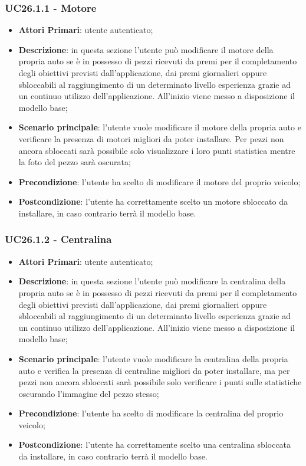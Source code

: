 \subsubsection{UC26.1.1 - Motore}
\begin{itemize}
	\item \textbf{Attori Primari}: utente autenticato;
	\item \textbf{Descrizione}: in questa sezione l'utente può modificare il motore della propria auto se è in possesso di pezzi ricevuti da premi per il completamento degli obiettivi previsti dall'applicazione, dai premi giornalieri oppure sbloccabili al raggiungimento di un determinato livello esperienza grazie ad un continuo utilizzo dell'applicazione.
	All'inizio viene messo a disposizione il modello base;
	\item \textbf{Scenario principale}: l'utente vuole modificare il motore della propria auto e verificare la presenza di motori migliori da poter installare. Per pezzi non ancora sbloccati sarà possibile solo visualizzare i loro punti statistica mentre la foto del pezzo sarà oscurata;
	\item \textbf{Precondizione}: l'utente ha scelto di modificare il motore del proprio veicolo; 
	\item \textbf{Postcondizione}: l'utente ha correttamente scelto un motore sbloccato da installare, in caso contrario terrà il modello base.
\end{itemize}
\subsubsection{UC26.1.2 - Centralina}
\begin{itemize}
	\item \textbf{Attori Primari}: utente autenticato;
	\item \textbf{Descrizione}: in questa sezione l'utente può modificare la centralina della propria auto se è in possesso di pezzi ricevuti da premi per il completamento degli obiettivi previsti dall'applicazione, dai premi giornalieri oppure sbloccabili al raggiungimento di un determinato livello esperienza grazie ad un continuo utilizzo dell'applicazione.
	All'inizio viene messo a disposizione il modello base;
	\item \textbf{Scenario principale}: l'utente vuole modificare la centralina della propria auto e verifica la presenza di centraline migliori da poter installare, ma per pezzi non ancora sbloccati sarà possibile solo verificare i punti sulle statistiche oscurando l'immagine del pezzo stesso;
	\item \textbf{Precondizione}: l'utente ha scelto di modificare la centralina del proprio veicolo; 
	\item \textbf{Postcondizione}: l'utente ha correttamente scelto una centralina sbloccata da installare, in caso contrario terrà il modello base.
\end{itemize}
